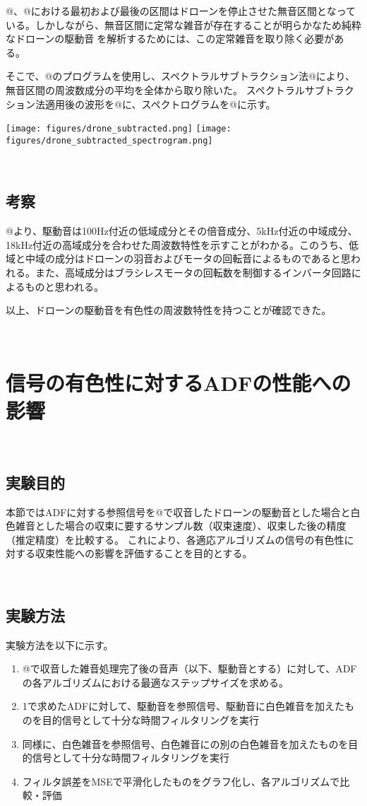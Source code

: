 @、@における最初および最後の区間はドローンを停止させた無音区間となっている。しかしながら、無音区間に定常な雑音が存在することが明らかなため純粋なドローンの駆動音を解析するためには、この定常雑音を取り除く必要がある。

そこで、@のプログラムを使用し、スペクトラルサブトラクション法@により、無音区間の周波数成分の平均を全体から取り除いた。
スペクトラルサブトラクション法適用後の波形を@に、スペクトログラムを@に示す。

\texttt{[image: figures/drone\_subtracted.png]}
\texttt{[image: figures/drone\_subtracted\_spectrogram.png]}

\
\subsection{考察}\label{consideration-drone}

@より、駆動音は100Hz付近の低域成分とその倍音成分、5kHz付近の中域成分、18kHz付近の高域成分を合わせた周波数特性を示すことがわかる。このうち、低域と中域の成分はドローンの羽音およびモータの回転音によるものであると思われる。また、高域成分はブラシレスモータの回転数を制御するインバータ回路によるものと思われる。

以上、ドローンの駆動音を有色性の周波数特性を持つことが確認できた。

\
\section{信号の有色性に対するADFの性能への影響}\label{adf-color-effect}

\
\subsection{実験目的}\label{purpose-color}

本節ではADFに対する参照信号を@で収音したドローンの駆動音とした場合と白色雑音とした場合の収束に要するサンプル数（収束速度）、収束した後の精度（推定精度）を比較する。
これにより、各適応アルゴリズムの信号の有色性に対する収束性能への影響を評価することを目的とする。

\
\subsection{実験方法}\label{instruction-color}

実験方法を以下に示す。

\begin{enumerate}
\renewcommand{\labelenumi}{(\arabic{enumi})}
\tightlist
\item
  @で収音した雑音処理完了後の音声（以下、駆動音とする）に対して、ADFの各アルゴリズムにおける最適なステップサイズを求める。
\item
  1で求めたADFに対して、駆動音を参照信号、駆動音に白色雑音を加えたものを目的信号として十分な時間フィルタリングを実行
\item
  同様に、白色雑音を参照信号、白色雑音にの別の白色雑音を加えたものを目的信号として十分な時間フィルタリングを実行
\item
  フィルタ誤差をMSEで平滑化したものをグラフ化し、各アルゴリズムで比較・評価
\end{enumerate}

